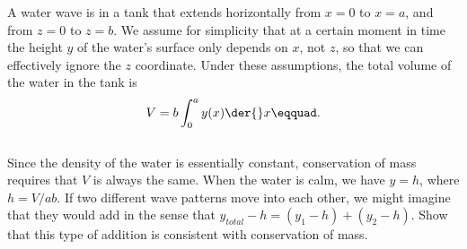         A water wave is in a tank that extends horizontally from $x=0$ to $x=a$, and
        from $z=0$ to $z=b$. We assume for simplicity that at a certain moment
        in time the height $y$ of the water's
        surface only depends on $x$, not $z$, so that we can effectively ignore the
        $z$ coordinate. Under these assumptions, the total volume of the water in the tank
        is \begin{displaymath}V = b \int_0^a{y(x) \der{}x}\eqquad.\end{displaymath}\\
        Since the density of the water is essentially
        constant, conservation of mass requires that $V$ is always the same. When the
        water is calm, we have $y=h$, where $h=V/ab$. If two different wave patterns move
        into each other, we might imagine that they would add in the sense that $y_{total}-h
        = (y_1-h) + (y_2-h)$. Show that this type of addition is consistent with conservation
        of mass. 
